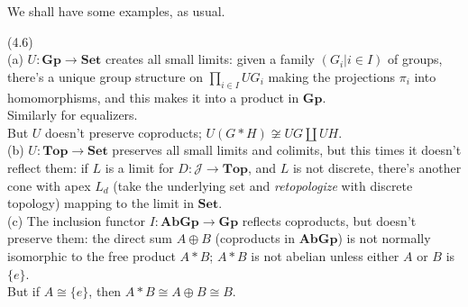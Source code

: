 \documentclass[a4paper]{article}
\begin{document}
We shall have some examples, as usual.

\begin{eg} (4.6)\\
    (a) $U : \mathbf{Gp} \to \mathbf{Set}$ creates all small limits: given a family $(G_i | i \in I)$ of groups, there's a unique group structure on $\prod_{i \in I} UG_i$ making the projections $\pi_i$ into homomorphisms, and this makes it into a product in $\mathbf{Gp}$.\\
    Similarly for equalizers.\\
    But $U$ doesn't preserve coproducts; $U(G * H) \not\cong UG \coprod UH$.\\
    (b) $U:\mathbf{Top} \to \mathbf{Set}$ preserves all small limits and colimits, but this times it doesn't reflect them: if $L$ is a limit for $D: \mathcal{J} \to \mathbf{Top}$, and $L$ is not discrete, there's another cone with apex $L_d$ (take the underlying set and \emph{retopologize} with discrete topology) mapping to the limit in $\mathbf{Set}$.\\
    (c) The inclusion functor $I:\mathbf{AbGp} \to \mathbf{Gp}$ reflects coproducts, but doesn't preserve them: the direct sum $A \oplus B$ (coproducts in $\mathbf{AbGp}$) is not normally isomorphic to the free product $A*B$; $A*B$ is not abelian unless either $A$ or $B$ is $\{e\}$.\\
    But if $A \cong \{e\}$, then $A*B \cong A \oplus B \cong B$.
\end{eg}
\end{document}
